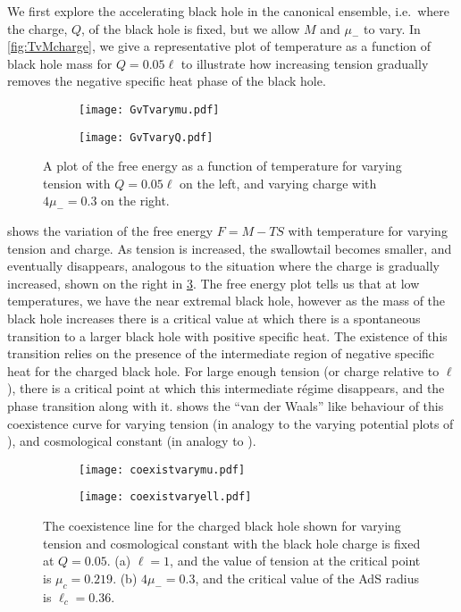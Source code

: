 \documentclass[
twoside,
openright,
frontopenright,
]{dmathesis}
\begin{document}
We first explore the accelerating black hole in the canonical ensemble, i.e.\
where the charge, $Q$, of the black hole is fixed, but we allow $M$ and $\mu_-$
to vary.  In \cref{fig:TvMcharge}, we give a representative plot of
temperature as a function of black hole mass for $Q=0.05\ell$ to illustrate how
increasing tension gradually removes the negative specific heat phase of the
black hole.
\begin{figure}
    \centering
  \begin{subfigure}[b]{0.45\textwidth}
    \texttt{[image: GvTvarymu.pdf]}
    \caption{\label{fig:GvTchargea}}
  \end{subfigure}\quad
  \begin{subfigure}[b]{0.45\textwidth}
    \texttt{[image: GvTvaryQ.pdf]}
    \caption{\label{fig:GvTchargeb}}
  \end{subfigure}
  \caption{\label{fig:GvTcharge}A plot of the free energy as a function of
    temperature for varying tension with $Q=0.05\ell$ on the left, and varying
    charge with $4\mu_-=0.3$ on the right.}
\end{figure}
 shows the variation of the free energy $F=M-TS$ with
temperature for varying tension and charge. As tension is increased, the
swallowtail becomes smaller, and eventually disappears, analogous to the
situation where the charge is gradually increased, shown on the right in
\cref{fig:GvTcharge}. The free energy plot tells us that at low temperatures, we
have the near extremal black hole, however as the mass of the black hole
increases there is a critical value at which there is a spontaneous transition
to a larger black hole with positive specific heat. The existence of this
transition relies on the presence of the intermediate region of negative
specific heat for the charged black hole.  For large enough tension (or charge
relative to $\ell$), there is a critical point at which this intermediate
r\'egime disappears, and the phase transition along with it. 
shows the ``van der Waals'' like behaviour of this coexistence curve for varying
tension (in analogy to the varying potential plots of \cite{Chamblin:1999tk}),
and cosmological constant (in analogy to \cite{Kubiznak:2012wp}).
\begin{figure}
  \centering
  \begin{subfigure}[b]{0.45\textwidth}
    \texttt{[image: coexistvarymu.pdf]}
    \caption{\label{fig:coexista}}
  \end{subfigure}\quad
  \begin{subfigure}[b]{0.45\textwidth}
    \texttt{[image: coexistvaryell.pdf]}
    \caption{\label{fig:coexistb}}
  \end{subfigure}
  \caption{\label{fig:coexist}The coexistence line for the charged black hole
    shown for varying tension and cosmological constant with the black hole
    charge is fixed at $Q=0.05$. (a) $\ell=1$, and the value of tension
    at the critical point is $\mu_c = 0.219$. (b) $4\mu_- = 0.3$, and
    the critical value of the AdS radius is $\ell_c = 0.36$.}
\end{figure}
\end{document}
